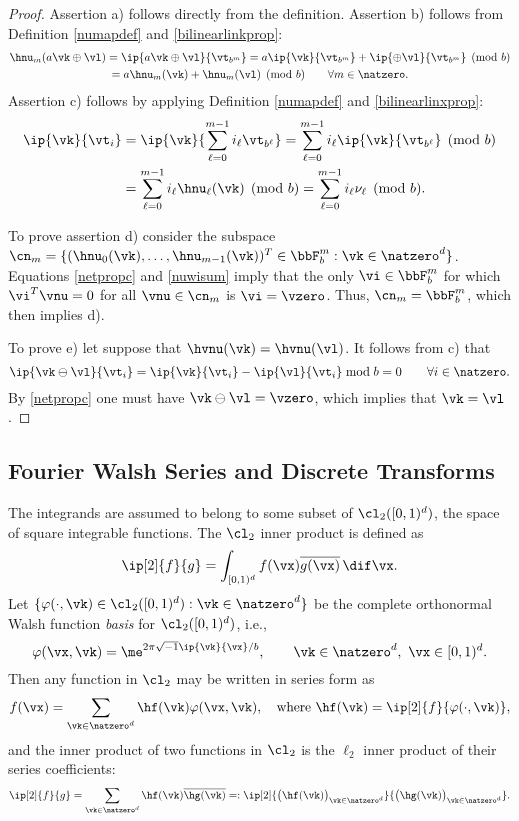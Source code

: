\documentclass[]{elsarticle}
\theoremstyle{definition}
\newcommand{\cube}{[0,1)^d}
\renewcommand{\bbK}{\natzero^d}
\begin{document}
\begin{proof} Assertion a) follows directly from the definition.  Assertion b) follows from Definition \ref{numapdef} and \eqref{bilinearlinkprop}:
\begin{multline*}
\hnu_m(a\vk \oplus \vl)= \ip{a\vk \oplus \vl}{\vt_{b^m}} = a\ip{\vk}{\vt_{b^m}} + \ip{\oplus \vl}{\vt_{b^m}} \pmod b \\
= a\hnu_m(\vk) + \hnu_m(\vl) \pmod b \qquad \forall m \in \natzero.
\end{multline*}
Assertion c) follows by applying  Definition \ref{numapdef} and \eqref{bilinearlinxprop}:
\begin{align*}
\ip{\vk}{\vt_i} &= \ip{\vk}{\sum_{\ell=0}^{m-1} i_\ell \vt_{b^{\ell}}} = \sum_{\ell=0}^{m-1} i_\ell \ip{\vk}{\vt_{b^{\ell}}} \pmod b \\
& = \sum_{\ell=0}^{m-1} i_\ell \hnu_\ell(\vk) \pmod b = \sum_{\ell=0}^{m-1} i_\ell \nu_\ell \pmod b.
\end{align*}

To prove assertion d) consider the subspace
$\cn_m = \{(\hnu_0(\vk), \ldots,  \hnu_{m-1}(\vk))^T \in \bbF_b^m : \vk \in \bbK\}$.
Equations \eqref{netpropc} and \eqref{nuwisum} imply that the only $\vi \in \bbF_b^m$ for which $\vi^T\vnu=0$ for all $\vnu \in \cn_m$ is $\vi=\vzero$.  Thus, $\cn_m=\bbF_b^m$, which then implies d).

To prove e) let suppose that $\hvnu(\vk)=\hvnu(\vl)$.  It follows from c) that
\[
\ip{\vk\ominus\vl}{\vt_i} = \ip{\vk}{\vt_i} - \ip{\vl}{\vt_i} \bmod b = 0 \qquad \forall i\in \natzero.
\]
By \eqref{netpropc} one must have $\vk\ominus\vl=\vzero$, which implies that $\vk=\vl$.
\end{proof}

\subsection{Fourier Walsh Series and Discrete Transforms}

The integrands are assumed to belong to some subset of $\cl_2(\cube)$, the space of square integrable functions.  The $\cl_2$ inner product is defined as
\[
\ip[2]{f}{g} = \int_{\cube} f(\vx) \overline{g(\vx)} \, \dif \vx.
\]
Let $\{\varphi(\cdot,\vk) \in \cl_2(\cube) : \vk \in \bbK\}$ be the complete orthonormal Walsh function \emph{basis} for $\cl_2(\cube)$, i.e.,
\[
\varphi(\vx,\vk)  = \me^{2 \pi \sqrt{-1} \ip{\vk}{\vx}/b}, \qquad \vk \in \bbK, \ \vx \in \cube.
\]
Then any function in $\cl_2$ may be written in series form as
\begin{equation} \label{Fourierdef}
f(\vx) = \sum_{\vk \in \bbK} \hf(\vk) \varphi(\vx,\vk), \quad \text{where } \hf(\vk) = \ip[2]{f}{\varphi(\cdot,\vk)},
\end{equation}
and the inner product of two functions in $\cl_2$ is the $\ell_2$ inner product of their series coefficients:
\[
\ip[2]{f}{g} = \sum_{\vk \in \bbK} \hf(\vk)\overline{\hg(\vk)} =: \ip[2]{\bigl(\hf(\vk)\bigr)_{\vk \in \bbK}}{\bigl ( \hg(\vk)\bigr )_{\vk \in \bbK}}.
\]
\end{document}
